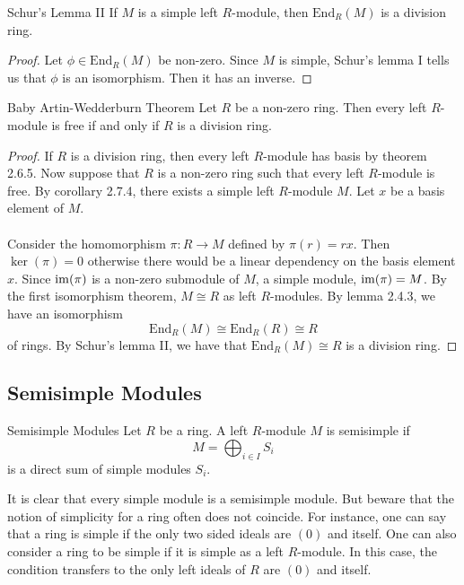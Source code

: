\documentclass[a4paper]{article}
\begin{document}
\begin{crl}{Schur's Lemma II}{} If $M$ is a simple left $R$-module, then $\text{End}_R(M)$ is a division ring. 
\begin{proof}
Let $\phi\in\text{End}_R(M)$ be non-zero. Since $M$ is simple, Schur's lemma I tells us that $\phi$ is an isomorphism. Then it has an inverse. 
\end{proof}
\end{crl}

\begin{thm}{Baby Artin-Wedderburn Theorem}{} Let $R$ be a non-zero ring. Then every left $R$-module is free if and only if $R$ is a division ring. 
\begin{proof}
If $R$ is a division ring, then every left $R$-module has basis by theorem 2.6.5. Now suppose that $R$ is a non-zero ring such that every left $R$-module is free. By corollary 2.7.4, there exists a simple left $R$-module $M$. Let $x$ be a basis element of $M$. \\~\\

Consider the homomorphism $\pi:R\to M$ defined by $\pi(r)=rx$. Then $\ker(\pi)=0$ otherwise there would be a linear dependency on the basis element $x$. Since $\operatorname{im}(\pi)$ is a non-zero submodule of $M$, a simple module, $\operatorname{im}(\pi)=M$. By the first isomorphism theorem, $M\cong R$ as left $R$-modules. By lemma 2.4.3, we have an isomorphism $$\text{End}_R(M)\cong\text{End}_R(R)\cong R$$ of rings. By Schur's lemma II, we have that $\text{End}_R(M)\cong R$ is a division ring. 
\end{proof}
\end{thm}

\subsection{Semisimple Modules}
\begin{defn}{Semisimple Modules}{} Let $R$ be a ring. A left $R$-module $M$ is semisimple if $$M=\bigoplus_{i\in I}S_i$$ is a direct sum of simple modules $S_i$. 
\end{defn}

It is clear that every simple module is a semisimple module. But beware that the notion of simplicity for a ring often does not coincide. For instance, one can say that a ring is simple if the only two sided ideals are $(0)$ and itself. One can also consider a ring to be simple if it is simple as a left $R$-module. In this case, the condition transfers to the only left ideals of $R$ are $(0)$ and itself. \\~\\
\end{document}
